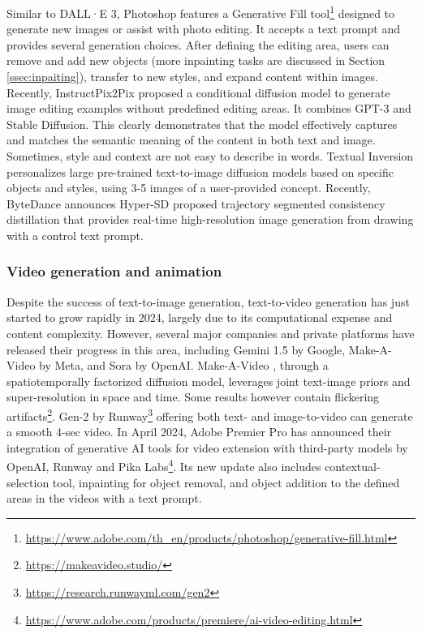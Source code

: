 \documentclass[11pt,a4paper]{article}
\begin{document}
Similar to DALL·E 3, Photoshop features a Generative Fill tool\footnote{\url{https://www.adobe.com/th_en/products/photoshop/generative-fill.html}} designed to generate new images or assist with photo editing. It accepts a text prompt and provides several generation choices. After defining the editing area, users can remove and add new objects (more inpainting tasks are discussed in Section \ref{ssec:inpaiting}), transfer to new styles, and expand content within images. Recently, InstructPix2Pix \cite{Brooks:InstructPix2Pix:2023} proposed a conditional diffusion model to generate image editing examples without predefined editing areas. It combines GPT-3 and Stable Diffusion. This clearly demonstrates that the model effectively captures and matches the semantic meaning of the content in both text and image. Sometimes, style and context are not easy to describe in words. Textual Inversion \cite{gal:Image:2023} personalizes large pre-trained text-to-image diffusion models based on specific objects and styles, using 3-5 images of a user-provided concept. Recently, ByteDance announces Hyper-SD \cite{ren:hypersd:2024} proposed trajectory segmented consistency distillation that provides real-time high-resolution image generation from drawing with a control text prompt. 


\subsubsection{Video generation and animation} 
\label{sssec:videogen}

Despite the success of text-to-image generation, text-to-video generation has just started to grow rapidly in 2024, largely due to its computational expense and content complexity. However, several major companies and private platforms have released their progress in this area, including Gemini 1.5 by Google, Make-A-Video by Meta, and Sora by OpenAI. Make-A-Video \cite{singer:Make:2023}, through a spatiotemporally factorized diffusion model, leverages joint text-image priors and super-resolution in space and time. Some results however contain  flickering artifacts\footnote{\url{https://makeavideo.studio/}}. Gen-2 by Runway\footnote{\url{https://research.runwayml.com/gen2}} offering both text- and image-to-video can generate a smooth 4-sec video. In April 2024, Adobe Premier Pro has announced their integration of generative AI tools for video extension with third-party models by OpenAI, Runway and Pika Labs\footnote{\url{https://www.adobe.com/products/premiere/ai-video-editing.html}}. Its new update also includes contextual-selection tool, inpainting for object removal, and object addition to the defined areas in the videos with a text prompt. 
\end{document}
